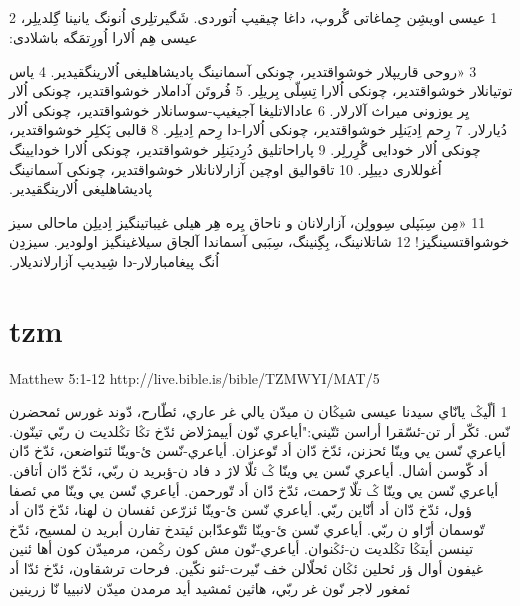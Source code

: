 \documentclass[12pt,fleqn,titlepage,twoside,a4paper]{book}
\begin{document}
\begin{arab}[utf]

\section*{}

‏1 عیسی اویشِن جِماغاتی گُروپ، داغا چیقیپ اُتوردی.‏ شَگیرتلِری اُنونگ یانینا گِلدیلِر، ‏2 عیسی هِم اُلارا اُورِتمَگه باشلادی:‏

‏3 ‏«‏روحی قاریپلار خوشواقتدیر، 
چونکی آسمانینگ پادیشاهلیغی اُلارینگقیدیر.‏
‏4 یاس توتیانلار خوشواقتدیر،
چونکی اُلارا تِسِلّی بِریلِر.‏
‏5 فُروتَن آداملار خوشواقتدیر،
چونکی اُلار یِر یوزونی میراث آلارلار.‏
‏6 عادالاتلیغا آجیغیپ-سوسانلار خوشواقتدیر،
چونکی اُلار دُیارلار.‏
‏7 رِحم اِدیَنلِر خوشواقتدیر،
چونکی اُلارا-دا رِحم اِدیلِر.‏
‏8 قالبی پَکلِر خوشواقتدیر،
چونکی اُلار خودایی گُرِرلِر.‏
‏9 پاراحاتلیق دُرِدیَنلِر خوشواقتدیر،
چونکی اُلارا خودایینگ اُغول‍لاری دییلِر.‏
‏10 تاقوالیق اوچین آزارلانانلار خوشواقتدیر،
چونکی آسمانینگ پادیشاهلیغی اُلارینگقیدیر.‏


‏11 ‏«‏مِن سِبَپلی سِوولِن، آزارلانان و ناحاق یِره هِر هیلی غیباتینگیز اِدیلِن ماحالی سیز خوشواقتسینگیز!‏ ‏12 شاتلانینگ، بِگِنینگ، سِبَبی آسماندا آلجاق سیلاغینگیز اولودیر.‏ سیزدِن اُنگ پیغامبارلار-دا شِیدیپ آزارلاندیلار.‏ 

\end{arab}

\section{tzm}

Matthew 5:1-12 http://live.bible.is/bible/TZMWYI/MAT/5

\begin{arab}[utf]


‏1 ألّيݣ يانّاي سيدنا عيسى شيݣان ن ميدّن يالي غر عاري، ئطّارح، دّوند غورس ئمحضرن نّس. ئكّر أر تن-ئسّقرا أراسن ئتّيني:"أياعري نّون أييمژلاض ئدّخ تݣا تݣلديت ن ربّي تينّون. أياعري نّسن يي وينّا ئحزنن، ئدّخ دّان أد تّوعزان. أياعري-نّسن ئ-وينّا ئتواضعن، ئدّخ دّان أد كّوسن أشال. أياعري نّسن يي وينّا ݣ ئلّا لاژ د فاد ن-ؤبريد ن ربّي، ئدّخ دّان أتافن. أياعري نّسن يي وينّا ݣ تلّا رّحمت، ئدّخ دّان أد تّورحمن. أياعري نّسن يي وينّا مي ئصفا ؤول، ئدّخ دّان أد أنّاين ربّي. أياعري نّسن ئ-وينّا ئزرّعن ئفسان ن لهنا، ئدّخ دّان أد تّوسمان أرّاو ن ربّي. أياعري نّسن ئ-وينّا ئتّوعدّابن ئيتدخ تفارن أبريد ن لمسيح، ئدّخ تينسن أيتݣا تݣلديت ن-ئݣنوان. أياعري-نّون مش كون رݣمن، مرميدّن كون أها ئنين غيفون أوال ؤر ئحلين ئݣان ئحلّالن خف نّيرت-ئنو نكّين. فرحات ترشقاون، ئدّخ ئدّا أد ئمغور لاجر نّون غر ربّي، هاثين ئمشيد أيد مرمدن ميدّن لانبييا نّا زرينين


\end{arab}
\end{document}
